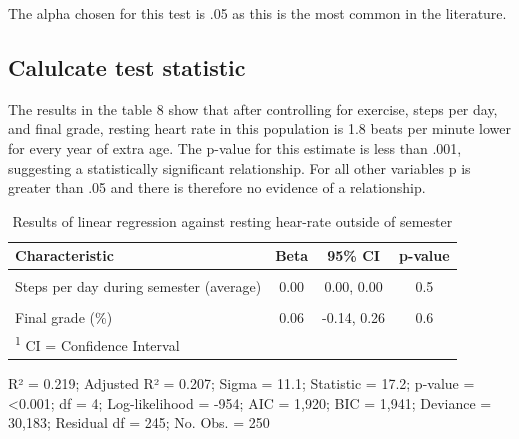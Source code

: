 \documentclass[preprint, 3p,
authoryear]{elsarticle} %
\begin{document}
The alpha chosen for this test is .05 as this is the most common in the
literature.

\hypertarget{calulcate-test-statistic-3}{%
\subsection{Calulcate test statistic}\label{calulcate-test-statistic-3}}

The results in the table 8 show that after controlling for exercise,
steps per day, and final grade, resting heart rate in this population is
1.8 beats per minute lower for every year of extra age. The p-value for
this estimate is less than .001, suggesting a statistically significant
relationship. For all other variables p is greater than .05 and there is
therefore no evidence of a relationship.

\begin{table}

\begin{threeparttable}
\caption{\label{tab:unnamed-chunk-11}Results of linear regression against resting hear-rate outside of semester}
\centering
\fontsize{7}{9}\selectfont
\begin{tabular}[t]{l|c|c|c}
\hline
\textbf{\textbf{Characteristic}} & \textbf{\textbf{Beta}} & \textbf{\textbf{95\% CI}} & \textbf{\textbf{p-value}}\\
\hline
\cellcolor{gray!6}{Age} & \cellcolor{gray!6}{-1.8} & \cellcolor{gray!6}{-2.2, -1.3} & \cellcolor{gray!6}{<0.001}\\
\hline
Steps per day during semester (average) & 0.00 & 0.00, 0.00 & 0.5\\
\hline
\cellcolor{gray!6}{Exercise during semsester (minutes per week)} & \cellcolor{gray!6}{0.01} & \cellcolor{gray!6}{-0.04, 0.07} & \cellcolor{gray!6}{0.6}\\
\hline
Final grade (\%) & 0.06 & -0.14, 0.26 & 0.6\\
\hline
\multicolumn{4}{l}{\rule{0pt}{1em}\textsuperscript{1} CI = Confidence Interval}\\
\end{tabular}
\begin{tablenotes}
\small
\item [] R² = 0.219; Adjusted R² = 0.207; Sigma = 11.1; Statistic = 17.2; p-value = <0.001; df = 4; Log-likelihood = -954; AIC = 1,920; BIC = 1,941; Deviance = 30,183; Residual df = 245; No. Obs. = 250
\end{tablenotes}
\end{threeparttable}
\end{table}
\end{document}
